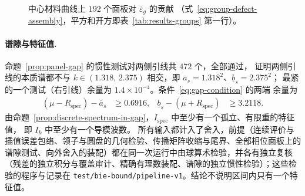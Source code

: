 \begin{figure}[htbp]
  \centering
  \caption{中心材料曲线上 $192$ 个面板对 $\overline\varepsilon_g$ 的贡献
  （式~\eqref{eq:group-defect-assembly}，平方和开方即表~\ref{tab:results-groups} 第一行）。}
  \label{fig:results-center-panels}
\end{figure}

\paragraph{谱隙与特征值.}
命题~\ref{prop:panel-gap} 的惯性测试对两侧引线共 $472$ 个，全部通过，
证明两侧引线的本质谱都不与 $k\in(1.318,\,2.375)$ 相交，即 $\overline a_s=1.318^2$、$\underline b_s=2.375^2$；
最紧的一个测试（右引线）余量为 $1.4\times10^{-4}$。条件~\eqref{eq:gap-condition} 的两端
余量为
\begin{align*}
  (\mu-R_{\mathrm{spec}})-\overline a_s&\ge0.6916,
  &\underline b_s-(\mu+R_{\mathrm{spec}})&\ge3.2118.
\end{align*}
由命题~\ref{prop:discrete-spectrum-in-gap}，$I_{\mathrm{spec}}$ 中至少有一个孤立、有限重的特征值，
即 $I_k$ 中至少有一个导模波数。
所有输入都计入了舍入，前提（连续评价与插值误差包络、领子与圆盘的几何检验、传播矩阵收缩与尾界、全部相位面板上的谱隙测试、向外舍入的装配）都在同一次运行中由球算术检验，并各有独立复核（残差的独立积分与覆盖审计、精确有理数装配、谱隙的独立惯性检验）；这些检验的程序与记录在 \texttt{test/bie-bound/pipeline-v1}。结论不说明区间内只有一个特征值。

